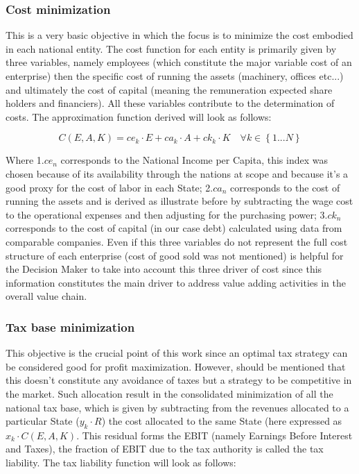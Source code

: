 \begin{doublespace}
\subsubsection{Cost minimization}
This is a very basic objective in which the focus is to  minimize the cost embodied in each national entity. The cost function for each entity is primarily given by three variables, namely employees (which constitute the major variable cost of an enterprise) then the specific cost of running the assets (machinery, offices etc...) and ultimately the cost of capital (meaning the remuneration expected share holders and financiers). All these variables contribute to the determination of costs. The approximation function derived will look as follows:

\begin{equation}
C(E,A,K)=ce_k\cdot E+ca_k\cdot A+ck_k\cdot K \quad \forall k \in \left\{1...N\right\}
\end{equation}

Where 1.$ce_n$ corresponds to the National Income per Capita, this index was chosen because of its availability through the nations at scope and because it's a good proxy for the cost of labor in each State; 2.$ca_n$ corresponds to the cost of running the assets and is derived as illustrate before by subtracting the wage cost to the operational expenses and then adjusting for the purchasing power; 3.$ck_n$ corresponds to the cost of capital (in our case debt) calculated using data from comparable companies.
Even if this three variables do not represent the full cost structure of each enterprise (cost of good sold was not mentioned) is helpful for the Decision Maker to take into account this three driver of cost since this information constitutes the main driver to address value adding activities in the overall value chain.

\subsubsection{Tax base minimization}
This objective is the crucial point of this work since an optimal tax strategy can be considered good for profit maximization. However, should be mentioned that this doesn't constitute any avoidance of taxes but a strategy to be competitive in the market. Such allocation result in the consolidated minimization of all the national tax base, which is given by subtracting from the revenues allocated to a particular State ($y_k \cdot R$) the cost allocated to the same State (here expressed as $x_k \cdot C(E, A,K)$. This residual forms the EBIT (namely Earnings Before Interest and Taxes), the fraction of EBIT due to the tax authority is called the tax liability. The tax liability function will look as follows:


\end{doublespace}
